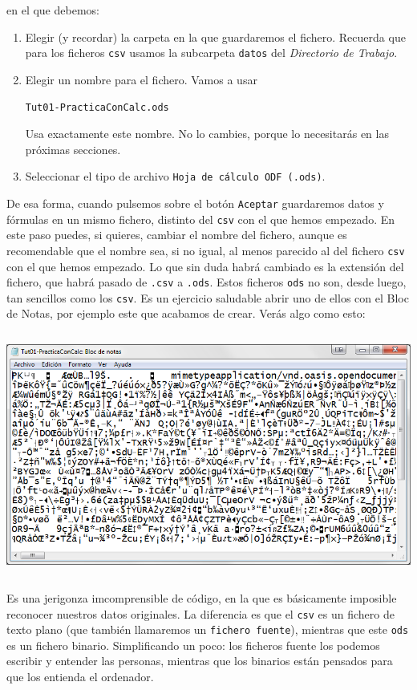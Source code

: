 \documentclass[10pt,a4paper]{article}\usepackage[]{graphicx}\usepackage[]{color}
\begin{document}
en el que debemos:
    \begin{enumerate}
    \item Elegir (y recordar) la carpeta en la que guardaremos el fichero. Recuerda que para los ficheros {\tt csv} usamos la subcarpeta {\tt datos} del {\em Directorio de Trabajo}.
    \item Elegir un nombre para el fichero. Vamos a usar
    \begin{center}
        {\tt Tut01-PracticaConCalc.ods}
    \end{center}
    Usa exactamente este nombre. No lo cambies, porque lo necesitarás en las próximas secciones.
    \item Seleccionar el tipo de archivo {\tt Hoja de cálculo ODF (.ods)}.
    \end{enumerate}
De esa forma, cuando pulsemos sobre el botón {\tt Aceptar} guardaremos datos y fórmulas en un mismo fichero, distinto del {\tt csv} con el que hemos empezado. En este paso puedes, si quieres, cambiar el nombre del fichero, aunque es recomendable que el nombre sea, si no igual, al menos parecido al del fichero {\tt csv} con el que hemos empezado. Lo que sin duda habrá cambiado es la {\sf extensión} del fichero, que habrá pasado de {\tt .csv} a {\tt .ods}. Estos ficheros {\tt ods} no son, desde luego, tan sencillos como los {\tt csv}. Es un ejercicio saludable abrir uno de ellos con el Bloc de Notas, por ejemplo este que acabamos de crear. Verás algo como esto:
    \begin{center}
    \includegraphics[height=8cm]{../fig/Tut01-Calc-tablaFrec-09.png}
    \end{center}
Es una jerigonza imcomprensible de código, en la que es básicamente imposible reconocer nuestros datos originales. La diferencia es que el {\tt csv} es un fichero de {\sf texto plano} (que también llamaremos un {\tt fichero fuente}), mientras que este {\tt ods} es un  {\sf fichero binario}. Simplificando un poco: los ficheros fuente los podemos escribir y entender las personas, mientras que los binarios están pensados para que los entienda el ordenador.
\end{document}
